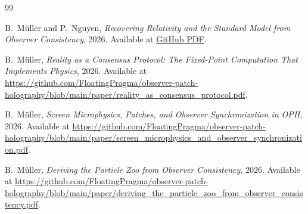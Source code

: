 \begin{thebibliography}{99}

B.~M\"uller and P.~Nguyen,
\emph{Recovering Relativity and the Standard Model from Observer Consistency},
2026.
Available at \href{https://github.com/FloatingPragma/observer-patch-holography/blob/main/paper/recovering_relativity_and_standard_model_structure_from_observer_overlap_consistency_compact.pdf}{GitHub PDF}.

B.~M\"uller,
\emph{Reality as a Consensus Protocol: The Fixed-Point Computation That Implements Physics},
2026.
Available at \url{https://github.com/FloatingPragma/observer-patch-holography/blob/main/paper/reality_as_consensus_protocol.pdf}.

B.~M\"uller,
\emph{Screen Microphysics, Patches, and Observer Synchronization in OPH},
2026.
Available at \url{https://github.com/FloatingPragma/observer-patch-holography/blob/main/paper/screen_microphysics_and_observer_synchronization.pdf}.

B.~M\"uller,
\emph{Deriving the Particle Zoo from Observer Consistency},
2026.
Available at \url{https://github.com/FloatingPragma/observer-patch-holography/blob/main/paper/deriving_the_particle_zoo_from_observer_consistency.pdf}.



\end{thebibliography}
